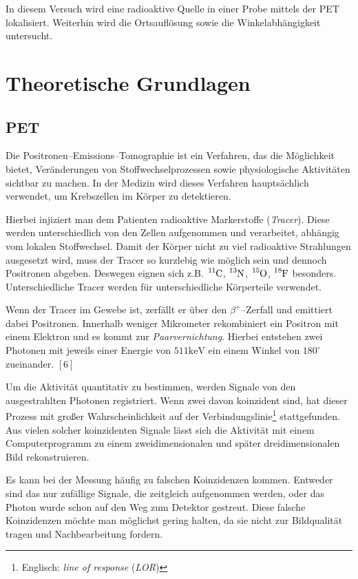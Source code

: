 \documentclass[12pt,a4paper]{scrartcl}
\numberwithin{equation}{section} %
\newcommand{\pu}[1]{\ensuremath{\mathrm{#1}}}
\renewcommand{\[}{} %
\renewcommand{\]}{\noindent} %
\begin{document}
In diesem Versuch wird eine radioaktive Quelle in einer Probe mittels
der PET lokalisiert. Weiterhin wird die Ortsauflösung sowie die
Winkelabhängigkeit untersucht.

\clearpage
\hypertarget{theoretische-grundlagen}{%
\section{Theoretische Grundlagen}\label{theoretische-grundlagen}}

\hypertarget{pet}{%
\subsection{PET}\label{pet}}

Die Positronen--Emissions--Tomographie ist ein Verfahren, das die
Möglichkeit bietet, Veränderungen von Stoffwechselprozessen sowie
physiologische Aktivitäten sichtbar zu machen. In der Medizin wird
dieses Verfahren hauptsächlich verwendet, um Krebszellen im Körper zu
detektieren.

Hierbei injiziert man dem Patienten radioaktive Markerstoffe
(\emph{Tracer}). Diese werden unterschiedlich von den Zellen aufgenommen
und verarbeitet, abhängig vom lokalen Stoffwechsel. Damit der Körper
nicht zu viel radioaktive Strahlungen ausgesetzt wird, muss der Tracer
so kurzlebig wie möglich sein und dennoch Positronen abgeben. Deswegen
eignen sich z.B. \(\ce{^{11}C}\), \(\ce{^{13}N}\), \(\ce{^{15}O}\),
\(\ce{^{18}F}\) besonders. Unterschiedliche Tracer werden für
unterschiedliche Körperteile verwendet.

Wenn der Tracer im Gewebe ist, zerfällt er über den \(\beta^+\)--Zerfall
und emittiert dabei Positronen. Innerhalb weniger Mikrometer
rekombiniert ein Positron mit einem Elektron und es kommt zur
\emph{Paarvernichtung}. Hierbei entstehen zwei Photonen mit jeweils
einer Energie von \(\pu{511 keV}\) ein einem Winkel von \(180^\circ\)
zueinander. \([6]\)

Um die Aktivität quantitativ zu bestimmen, werden Signale von den
ausgestrahlten Photonen registriert. Wenn zwei davon koinzident sind,
hat dieser Prozess mit großer Wahrscheinlichkeit auf der
Verbindungslinie\footnote{Englisch: \emph{line of response} (\emph{LOR})}
stattgefunden. Aus vielen solcher koinzidenten Signale lässt sich die
Aktivität mit einem Computerprogramm zu einem zweidimensionalen und
später dreidimensionalen Bild rekonstruieren.

Es kann bei der Messung häufig zu falschen Koinzidenzen kommen. Entweder
sind das nur zufällige Signale, die zeitgleich aufgenommen werden, oder
das Photon wurde schon auf den Weg zum Detektor gestreut. Diese falsche
Koinzidenzen möchte man möglichst gering halten, da sie nicht zur
Bildqualität tragen und Nachbearbeitung fordern.
\end{document}

